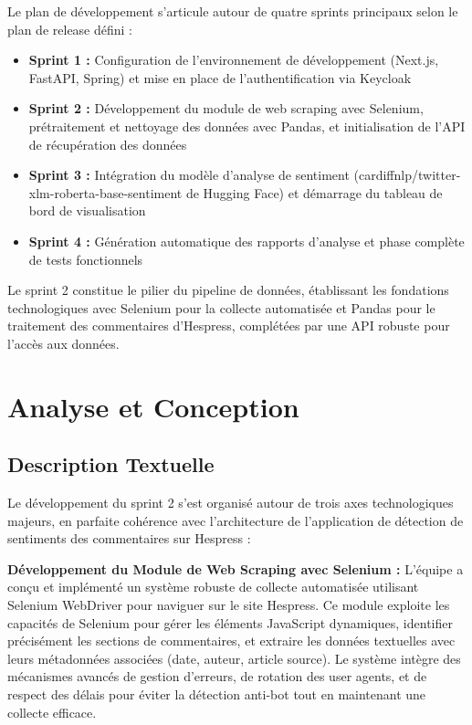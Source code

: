 Le plan de développement s'articule autour de quatre sprints principaux selon le plan de release défini :

\begin{itemize}
    \item \textbf{Sprint 1 :} Configuration de l'environnement de développement (Next.js, FastAPI, Spring) et mise en place de l'authentification via Keycloak
    \item \textbf{Sprint 2 :} Développement du module de web scraping avec Selenium, prétraitement et nettoyage des données avec Pandas, et initialisation de l'API de récupération des données
    \item \textbf{Sprint 3 :} Intégration du modèle d'analyse de sentiment (cardiffnlp/twitter-xlm-roberta-base-sentiment de Hugging Face) et démarrage du tableau de bord de visualisation
    \item \textbf{Sprint 4 :} Génération automatique des rapports d'analyse et phase complète de tests fonctionnels
\end{itemize}

Le sprint 2 constitue le pilier du pipeline de données, établissant les fondations technologiques avec Selenium pour la collecte automatisée et Pandas pour le traitement des commentaires d'Hespress, complétées par une API robuste pour l'accès aux données.

\section{Analyse et Conception}

\subsection{Description Textuelle}

Le développement du sprint 2 s'est organisé autour de trois axes technologiques majeurs, en parfaite cohérence avec l'architecture de l'application de détection de sentiments des commentaires sur Hespress :

\textbf{Développement du Module de Web Scraping avec Selenium :} L'équipe a conçu et implémenté un système robuste de collecte automatisée utilisant Selenium WebDriver pour naviguer sur le site Hespress. Ce module exploite les capacités de Selenium pour gérer les éléments JavaScript dynamiques, identifier précisément les sections de commentaires, et extraire les données textuelles avec leurs métadonnées associées (date, auteur, article source). Le système intègre des mécanismes avancés de gestion d'erreurs, de rotation des user agents, et de respect des délais pour éviter la détection anti-bot tout en maintenant une collecte efficace.

